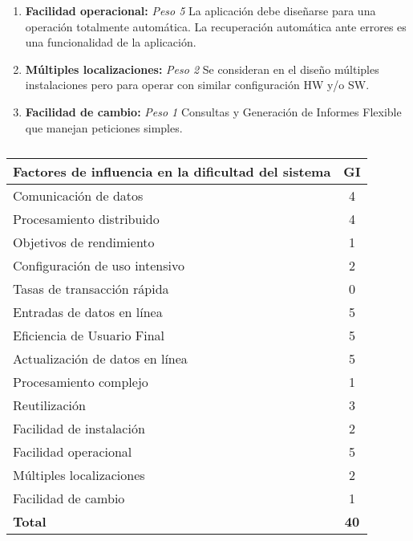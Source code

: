 \documentclass[11pt,a4paper,spanish,twoside]{book}
\begin{document}
\begin{enumerate}[{\bf 1.}]
\item {\bf Facilidad operacional:} \emph{Peso 5} La aplicación debe diseñarse
  para una operación totalmente automática. La recuperación automática ante
  errores es una funcionalidad de la aplicación. 

\item {\bf Múltiples localizaciones:} \emph{Peso 2} Se consideran en el diseño
  múltiples instalaciones pero para operar con similar configuración HW y/o SW.

\item {\bf Facilidad de cambio:} \emph{Peso 1} Consultas y Generación de
  Informes Flexible que manejan peticiones simples.

\end{enumerate}

\begin{table}[!ht]
  \centering
  \begin{tabular}{|l|c|}
    \hline
    \textbf{Factores de influencia en la dificultad del sistema} & 
    \textbf{GI} \\
    \hline \hline
    Comunicación de datos           & 4 \\ \hline
    Procesamiento distribuido       & 4 \\ \hline
    Objetivos de rendimiento        & 1 \\ \hline
    Configuración de uso intensivo  & 2 \\ \hline
    Tasas de transacción rápida     & 0 \\ \hline
    Entradas de datos en línea      & 5 \\ \hline
    Eficiencia de Usuario Final     & 5 \\ \hline
    Actualización de datos en línea & 5 \\ \hline
    Procesamiento complejo          & 1 \\ \hline
    Reutilización                   & 3 \\ \hline
    Facilidad de instalación        & 2 \\ \hline
    Facilidad operacional           & 5 \\ \hline
    Múltiples localizaciones        & 2 \\ \hline
    Facilidad de cambio             & 1 \\ \hline \hline
    \textbf{Total}                  & \textbf{40} \\ \hline
  \end{tabular}
  \label{}
  \caption{}
\end{table}
\end{document}

